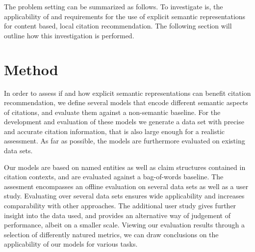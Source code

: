 The problem setting can be summarized as follows. To investigate is, the applicability of and requirements for the use of explicit semantic representations for content based, local citation recommendation. The following section will outline how this investigation is performed.

\section{Method}\label{sec:method}
In order to assess if and how explicit semantic representations can benefit citation recommendation, we define several models that encode different semantic aspects of citations, and evaluate them against a non-semantic baseline. For the development and evaluation of these models we generate a data set with precise and accurate citation information, that is also large enough for a realistic assessment. As far as possible, the models are furthermore evaluated on existing data sets.

Our models are based on named entities as well as claim structures contained in citation contexts, and are evaluated against a bag-of-words baseline. The assesment encompasses an offline evaluation on several data sets as well as a user study. Evaluating over several data sets ensures wide applicability and increases comparability with other approaches. The additional user study gives further insight into the data used, and provides an alternative way of judgement of performance, albeit on a smaller scale. Viewing our evaluation results through a selection of differently natured metrics, we can draw conclusions on the applicability of our models for various tasks.

